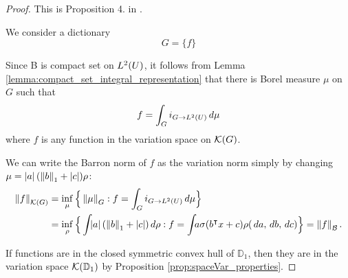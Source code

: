 \begin{proof}

    \TODO

    This is Proposition 4. in \cite{siegelCharacterizationVariationSpaces2022}.

    We consider a dictionary
    \begin{equation}
        G = \{
            f
        \}
    \end{equation}

    Since B is compact set on $L^{2}(U)$, it follows from Lemma
    \ref{lemma:compact_set_integral_representation} that there is Borel measure
    $\mu$ on $G$ such that 
    \begin{equation}
        f = \int_G i_{{G}\to{L^{2}(U)}} \,d\mu
    \end{equation}
    where $f$ is any function in the variation space on $\mathcal{K}({G})$.

    We can write the Barron norm of $f$ as the variation norm simply by changing
    $\mu = \left| a \right|(\left\| b \right\|_1 + \left| c \right|) \rho$:
    \begin{align*}
        \left\| {f} \right\|_{\mathcal{K}({G})}
        &= \inf_{\mu} \Big\{ 
            \left\| \mu \right\|_{G}: f = \int_G i_{{G}\to{L^{2}(U)}} \,d\mu
        \Big\} \\
        &= \inf_{\rho} \Big\{
            \int_{} \left| a \right| (\left\| b \right\|_1 + \left| c \right|) \,d\rho: 
            f = \int_{} a \sigma(b{}^{\intercal} x + c) \rho(\,da,\,db,\,dc)
        \Big\}
        = \left\| f \right\|_{\mathcal{B}}.
    \end{align*}

    If functions are in the closed symmetric convex hull of $\mathbb{D}_1$, then
    they are in the variation space $\mathcal{K}({\mathbb{D}_1})$ by Proposition
    \ref{prop:spaceVar_properties}.

\end{proof}





